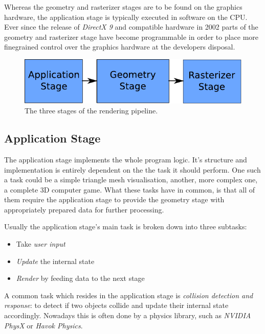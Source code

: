 Whereas the geometry and rasterizer stages are to be found on the graphics
hardware, the application stage is typically executed in software on the CPU.
Ever since the release of \textit{DirectX 9} and compatible hardware in 2002
parts of the geometry and rasterizer stage have become programmable in order
to place more finegrained control over the graphics hardware at the developers
disposal.

\begin{figure}
\begin{center}
\includegraphics[scale=0.8]{Images/Rendering-Pipeline-AGR.pdf}
\caption{The three stages of the rendering pipeline.}
\label{fig:RAGR}
\end{center}
\end{figure}

\subsection{Application Stage}
The application stage implements the whole program logic. It's structure and
implementation is entirely dependent on the the task it should perform. One
such a task could be a simple triangle mesh visualisation, another, more
complex one, a complete 3D computer game. What these tasks have in common, is
that all of them require the application stage to provide the geometry stage
with appropriately prepared data for further processing.

Usually the application stage's main task is broken down into three subtasks:
\begin{itemize}
 \item Take \textit{user input}
 \item \textit{Update} the internal state
 \item \textit{Render} by feeding data to the next stage
\end{itemize}

A common task which resides in the application stage is \textit{collision
detection and response}: to detect if two objects collide and update their
internal state accordingly. Nowadays this is often done by a physics library,
such as \textit{NVIDIA PhysX}\cite{misc:ageia-physx} or \textit{Havok
Physics}\cite{misc:havok}.

